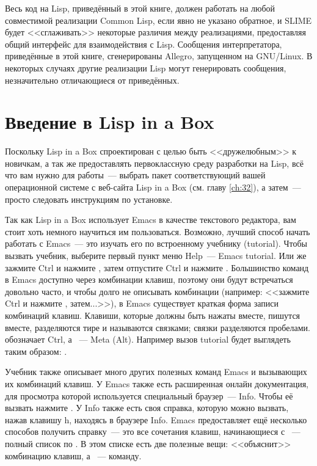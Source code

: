 Весь код на Lisp, приведённый в этой книге, должен работать на любой совместимой
реализации Common Lisp, если явно не указано обратное, и SLIME будет <<сглаживать>>
некоторые различия между реализациями, предоставляя общий интерфейс для взаимодействия с
Lisp. Сообщения интерпретатора, приведённые в этой книге, сгенерированы Allegro,
запущенном на GNU/Linux. В некоторых случаях другие реализации Lisp могут
генерировать сообщения, незначительно отличающиеся от приведённых.

\section{Введение в Lisp in a Box}

Поскольку Lisp in a Box спроектирован с целью быть <<дружелюбным>> к новичкам, а
так же предоставлять первоклассную среду разработки на Lisp, всё что вам нужно для
работы~--- выбрать пакет соответствующий вашей операционной системе с веб-сайта
Lisp in a Box (см. главу \ref{ch:32}), а затем~--- просто следовать инструкциям
по установке.

Так как Lisp in a Box использует Emacs в качестве текстового редактора, вам стоит хоть
немного научиться им пользоваться. Возможно, лучший способ начать работать с Emacs~--- это
изучать его по встроенному учебнику (tutorial). Чтобы вызвать учебник, выберите первый
пункт меню Help~--- Emacs tutorial. Или же зажмите Ctrl и нажмите , затем отпустите Ctrl и
нажмите . Большинство команд в Emacs доступно через комбинации клавиш, поэтому они будут
встречаться довольно часто, и чтобы долго не описывать комбинации (например: <<зажмите Ctrl
и нажмите , затем...>>), в Emacs существует краткая форма записи комбинаций
клавиш. Клавиши, которые должны быть нажаты вместе, пишутся вместе, разделяются тире и
называются связками; связки разделяются пробелами.  обозначает Ctrl, а ~--- Meta
(Alt). Например вызов tutorial будет выглядеть таким образом: .

Учебник также описывает много других полезных команд Emacs и вызывающих их комбинаций
клавиш. У Emacs также есть расширенная онлайн документация, для просмотра которой
используется специальный браузер~--- Info. Чтобы её вызвать нажмите . У Info также
есть своя справка, которую можно вызвать, нажав клавишу h, находясь в браузере Info. Emacs
предоставляет ещё несколько способов получить справку~--- это все сочетания клавиш,
начинающиеся с ~--- полный список по . В этом списке есть две
полезные вещи:  <<объяснит>> комбинацию клавиш, а ~--- команду.

